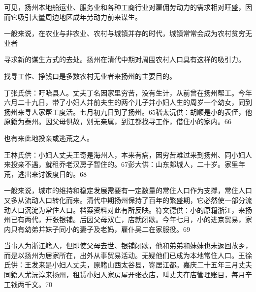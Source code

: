 可见，扬州本地船运业、服务业和各种工商行业对雇佣劳动力的需求相对旺盛，因而它吸引大量周边地区成年劳动力前来谋生。


\noindent 一般来说，在农业与非农业、农村与城镇并存的时代，城镇常常会成为农村贫穷无业者

寻求新的谋生方式的去处。扬州在清代中期对周围农村人口具有这样的吸引力。

找寻工作、挣钱口是多数农村无业者来扬州的主要目的。

丁张氏供：盱眙县人。丈夫丁名因家里穷苦，没有生计，从前曾在扬州帮工。今年六月二十九日，带了小妇人并前夫生的两个儿子并小妇人生的周岁一个幼女，同到扬州来寻人家帮工度活。七月初九日到了扬州。65嵇太沅供：胡顺是小的表侄，他原籍为泰州。因父母俱故，别无亲属，到江都找寻工作，借住小的家内。66

也有来此地投亲或逃荒之人。

\vfill
\begin{BookNotes}
\end{BookNotes}

王林氏供：小妇人丈夫王奇是海州人，本来有病，因穷苦难过来到扬州、同小妇人来投亲不遇，就租乔老汉房子暂住的。67彭大供：山东郯城人，二十岁。家里年荒，逃出来讨饭度日的。68


\noindent 一般来说，城市的维持和稳定发展需要有一定数量的常住人口作为支撑，常住人口又多从流动人口转化而来。清代中期扬州保持了百年的繁盛期，它必然使一部分流动人口沉淀为常住人口。档案资料对此有所反映。符文德供：小的原籍浙江，来扬州已有两代，开张银铺。后因父母双亡，店就闭歇。今年七月，小的进京贸易，家内只有幼弟并妹子同小的妻子及老妈，雇仆吴二在家服役。69

当事人为浙江籍人，但即使父母去世、银铺闭歇，他和弟弟和妹妹也未返回故乡，而是以扬州为居家所在，出外从事贸易活动。无疑他们已成为本地常住人口。王徐氏供：王发来是小妇人丈夫，原籍山西太谷县，寄居江都。嘉庆二十五年三月丈夫同籍人尤沅淳来扬州，租赁小妇人家房屋开张衣店，叫丈夫在店管理账目，每月辛工钱两千文。70

